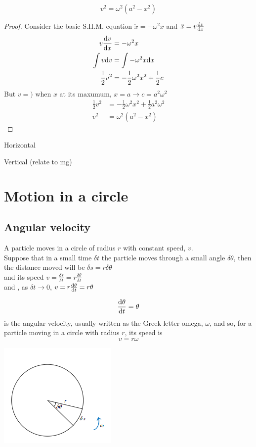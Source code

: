 \documentclass[a4paper]{article}
\begin{document}
\begin{prop}
	\[
		v^2=\omega^2(a^2-x^2)
	\]
	\begin{proof}
		Consider the basic S.H.M. equation $\ddot{x}=-\omega^2x$ and $\ddot{x}=v \frac{\mathrm{d} v}{\mathrm{d} x}$
		\begin{align*}
			v \frac{\mathrm{d} v}{\mathrm{d} x} & =-\omega^2x                           \\
			\int v \mathrm{d} v         & =\int -\omega^2 x \mathrm{d} x                \\
			\frac{1}{2}v^2      & =-\frac{1}{2}\omega^2x^2+\frac{1}{2}c
		\end{align*}
		But $v=)$ when $x$ at its maxumum, $x= a \rightarrow c=a^2\omega^2$
		\begin{align*}
			\frac{1}{2}v^2 & =-\frac{1}{2}\omega^2x^2+\frac{1}{2}a^2\omega^2 \\
			v^2            & =\omega^2(a^2-x^2)
		\end{align*}
	\end{proof}
\end{prop}
Horizontal
\begin{eg}
\end{eg}
Vertical (relate to mg)
\begin{eg}
\end{eg}
\section{Motion in a circle}
\subsection{Angular velocity}
A particle moves in a circle of radius $r$ with constant speed, $v$.\\

Suppose that in a small time $\delta t$ the particle moves through a small angle $\delta\theta$, then the distance moved will be $\delta s = r\delta \theta$
\\
and its speed $v=\frac{\delta s}{\delta t}=r\frac{\delta \theta}{\delta t}$\\

and , as $\delta t \rightarrow 0$, $v=r\frac{\mathrm{d} \theta}{\mathrm{d} t}=r\theta$

\[
	\frac{\mathrm{d}\theta}{\mathrm{d} t}=\theta
\]
is the angular velocity, usually written as the Greek letter omega, $\omega$, and so, for a particle moving in a circle with radius $r$, its speed is
\[
	v=r\omega
\]

\begin{center}
	\includegraphics[scale=0.5]{img_M/13_intro1}
\end{center}
\end{document}
